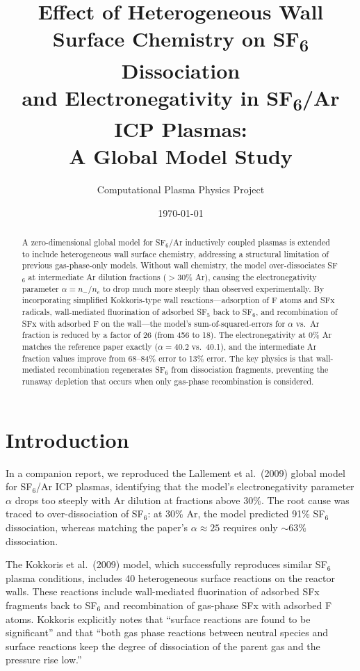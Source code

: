 \documentclass[11pt,a4paper]{article}
\title{Effect of Heterogeneous Wall Surface Chemistry on SF\textsubscript{6} Dissociation\\and Electronegativity in SF\textsubscript{6}/Ar ICP Plasmas:\\A Global Model Study}
\author{Computational Plasma Physics Project}
\date{\today}
\newcommand{\ne}{n_e}
\begin{document}
\maketitle

\begin{abstract}
A zero-dimensional global model for SF$_6$/Ar inductively coupled plasmas is extended to include heterogeneous wall surface chemistry, addressing a structural limitation of previous gas-phase-only models.  Without wall chemistry, the model over-dissociates SF$_6$ at intermediate Ar dilution fractions ($>$30\% Ar), causing the electronegativity parameter $\alpha = n_-/\ne$ to drop much more steeply than observed experimentally.  By incorporating simplified Kokkoris-type wall reactions---adsorption of F atoms and SFx radicals, wall-mediated fluorination of adsorbed SF$_5$ back to SF$_6$, and recombination of SFx with adsorbed F on the wall---the model's sum-of-squared-errors for $\alpha$ vs.\ Ar fraction is reduced by a factor of 26 (from 456 to 18).  The electronegativity at 0\% Ar matches the reference paper exactly ($\alpha = 40.2$ vs.\ 40.1), and the intermediate Ar fraction values improve from 68--84\% error to 13\% error.  The key physics is that wall-mediated recombination regenerates SF$_6$ from dissociation fragments, preventing the runaway depletion that occurs when only gas-phase recombination is considered.
\end{abstract}

\section{Introduction}

In a companion report, we reproduced the Lallement et al.\ (2009) global model for SF$_6$/Ar ICP plasmas, identifying that the model's electronegativity parameter $\alpha$ drops too steeply with Ar dilution at fractions above 30\%.  The root cause was traced to over-dissociation of SF$_6$: at 30\% Ar, the model predicted 91\% SF$_6$ dissociation, whereas matching the paper's $\alpha \approx 25$ requires only $\sim$63\% dissociation.

The Kokkoris et al.\ (2009) model, which successfully reproduces similar SF$_6$ plasma conditions, includes 40 heterogeneous surface reactions on the reactor walls.  These reactions include wall-mediated fluorination of adsorbed SFx fragments back to SF$_6$ and recombination of gas-phase SFx with adsorbed F atoms.  Kokkoris explicitly notes that ``surface reactions are found to be significant'' and that ``both gas phase reactions between neutral species and surface reactions keep the degree of dissociation of the parent gas and the pressure rise low.''
\end{document}
